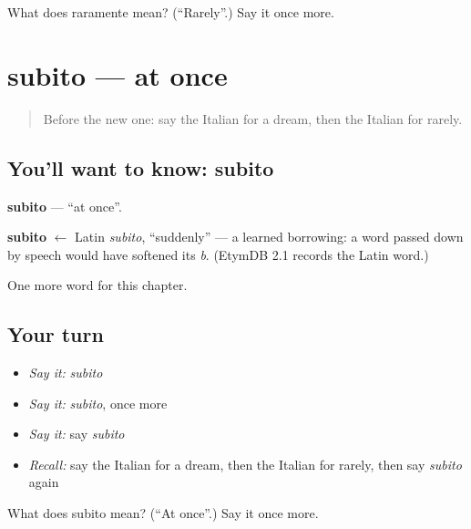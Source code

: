 \begin{tcolorbox}[breakable,colback=teal!4,colframe=teal!35!black,title={Before you move on}]
What does raramente mean? (\textquotedblleft{}Rarely\textquotedblright{}.) Say it once more.
\end{tcolorbox}
\section[subito]{subito — at once}

\label{lesson:IT-C153-subito}



\begin{quote}
Before the new one: say the Italian for a dream, then the Italian for rarely.
\end{quote}

\subsection*{You'll want to know: subito}
\textbf{subito} — \textquotedblleft{}at once\textquotedblright{}.

\begin{cousinweb}
\textbf{subito} $\leftarrow$ Latin \emph{subito}, \textquotedblleft{}suddenly\textquotedblright{} — a learned borrowing: a word passed down by speech would have softened its \emph{b}. (EtymDB 2.1 records the Latin word.)
\end{cousinweb}

\begin{grammarlens}[title={What you've built}]
One more word for this chapter.
\end{grammarlens}

\subsection*{Your turn}
\begin{itemize}
\raggedright
  \item \emph{Say it:} \emph{subito}
  \item \emph{Say it:} \emph{subito}, once more
  \item \emph{Say it:} say \emph{subito}
  \item \emph{Recall:} say the Italian for a dream, then the Italian for rarely, then say \emph{subito} again
\end{itemize}

\begin{tcolorbox}[breakable,colback=teal!4,colframe=teal!35!black,title={Before you move on}]
What does subito mean? (\textquotedblleft{}At once\textquotedblright{}.) Say it once more.
\end{tcolorbox}
